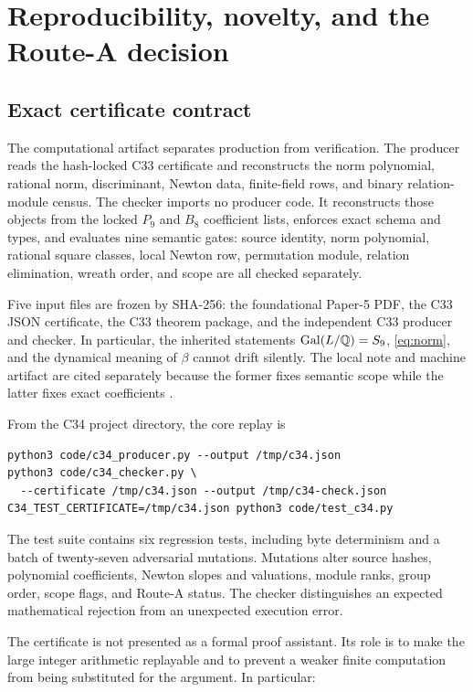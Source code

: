 \section{Reproducibility, novelty, and the Route-A decision}

\subsection{Exact certificate contract}

The computational artifact separates production from verification.  The
producer reads the hash-locked C33 certificate and reconstructs the norm
polynomial, rational norm, discriminant, Newton data, finite-field rows, and
binary relation-module census.  The checker imports no producer code.  It
reconstructs those objects from the locked \(P_9\) and \(B_8\) coefficient
lists, enforces exact schema and types, and evaluates nine semantic gates:
source identity, norm polynomial, rational square classes, local Newton row,
permutation module, relation elimination, wreath order, and scope are all
checked separately.

Five input files are frozen by SHA-256: the foundational Paper-5 PDF, the
C33 JSON certificate, the C33 theorem package, and the independent C33
producer and checker.  In particular, the inherited statements
\(\operatorname{Gal}(L/\mathbb{Q})=S_9\), \eqref{eq:norm}, and the dynamical meaning of \(\beta\)
cannot drift silently.  The local note and machine artifact are cited
separately because the former fixes semantic scope while the latter fixes
exact coefficients \citep{hcs2026c33note,hcs2026c33certificate}.

From the C34 project directory, the core replay is
\begin{verbatim}
python3 code/c34_producer.py --output /tmp/c34.json
python3 code/c34_checker.py \
  --certificate /tmp/c34.json --output /tmp/c34-check.json
C34_TEST_CERTIFICATE=/tmp/c34.json python3 code/test_c34.py
\end{verbatim}
The test suite contains six regression tests, including byte determinism
and a batch of twenty-seven adversarial mutations.  Mutations alter source
hashes, polynomial coefficients, Newton slopes and valuations, module ranks,
group order, scope flags, and Route-A status.  The checker distinguishes an
expected mathematical rejection from an unexpected execution error.

The certificate is not presented as a formal proof assistant.  Its role is
to make the large integer arithmetic replayable and to prevent a weaker
finite computation from being substituted for the argument.  In particular:

